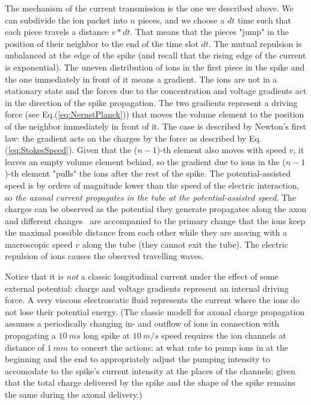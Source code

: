The mechanism of the current transmission is the one we described
above. We can subdivide the ion packet into $n$ pieces, and we choose a $dt$ time such that each piece travels a distance $v*dt$. That means that the pieces "jump" in the position of their
neighbor to the end of the time slot $dt$. 
The mutual repulsion is unbalanced at the edge of the spike
(and recall that the rising edge of the current is exponential).
The uneven distribution of ions in the first piece in the spike
and the one immediately in front of it means a gradient. 
The ions are not in a stationary state and the forces due to the concentration and voltage gradients act in the direction of the spike propagation.
The two gradients represent a driving force (see Eq.(\ref{eq:NernstPlanck})) that moves the volume element to the 
position of the neighbor immediately in front of it. 
The case is described by Newton's first law:
the gradient acts on the charges by the force as described by Eq.
(\ref{eq:StokesSpeed}). Given that the ($n-1$)-th element also moves
with speed $v$, it leaves an empty volume element behind, so the  gradient due to ions in the ($n-1$)-th element "pulls" the ions after the rest of the spike.
The potential-assisted
speed is by orders of magnitude lower than the speed of the electric
interaction, so \emph{the axonal current propagates in the tube at the
potential-assisted speed}. The charges can be observed as the potential
they generate propagates along the axon and different changes~\cite{MechanicalWaves:2015} are accompanied to the primary change that the ions keep the maximal possible distance from each other while they are moving with a macroscopic speed $v$ along the tube (they cannot exit the tube). The electric repulsion of ions causes the observed travelling waves.

Notice that it is \textit{not} a classic longitudinal current under the effect of some external potential: charge and voltage gradients represent an internal driving force.
A very viscous electroscatic fluid represents the current
where the ions do not lose their potential energy. 
(The classic modell for axonal charge propagation assumes
a periodically changing in- and outflow of ions in connection with
propagating a $10\ ms$ long spike at $10\ m/s$ speed requires the
ion channels at distance of $1\ mm$ to concert the actions: at what
rate to pump ions in at the beginning and the end to appropriately
adjust the pumping intensity to accomodate to the spike's current
intensity at the places of the channels; given that the total charge
delivered by the spike and the shape of the spike remains the same during the axonal delivery.)

